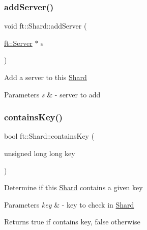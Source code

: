 \subsubsection{\texorpdfstring{add\+Server()}{addServer()}}
{\footnotesize\ttfamily void ft\+::\+Shard\+::add\+Server (\begin{DoxyParamCaption}\item[{\mbox{\hyperlink{classft_1_1Server}{ft\+::\+Server}} $\ast$}]{s }\end{DoxyParamCaption})\hspace{0.3cm}{\ttfamily [inline]}}

Add a server to this \mbox{\hyperlink{classft_1_1Shard}{Shard}}


\begin{DoxyParams}{Parameters}
{\em s} & -\/ server to add \\
\hline
\end{DoxyParams}
\mbox{\label{classft_1_1Shard_a42e25665d6fc9d6075d0477e3470c293}} 
\subsubsection{\texorpdfstring{contains\+Key()}{containsKey()}}
{\footnotesize\ttfamily bool ft\+::\+Shard\+::contains\+Key (\begin{DoxyParamCaption}\item[{unsigned long long}]{key }\end{DoxyParamCaption})\hspace{0.3cm}{\ttfamily [inline]}}

Determine if this \mbox{\hyperlink{classft_1_1Shard}{Shard}} contains a given key


\begin{DoxyParams}{Parameters}
{\em key} & -\/ key to check in \mbox{\hyperlink{classft_1_1Shard}{Shard}}\\
\hline
\end{DoxyParams}
\begin{DoxyReturn}{Returns}
true if contains key, false otherwise 
\end{DoxyReturn}
\mbox{\label{classft_1_1Shard_a5c75dfb7d06ed5ff8a1ceeca7b199576}} 
